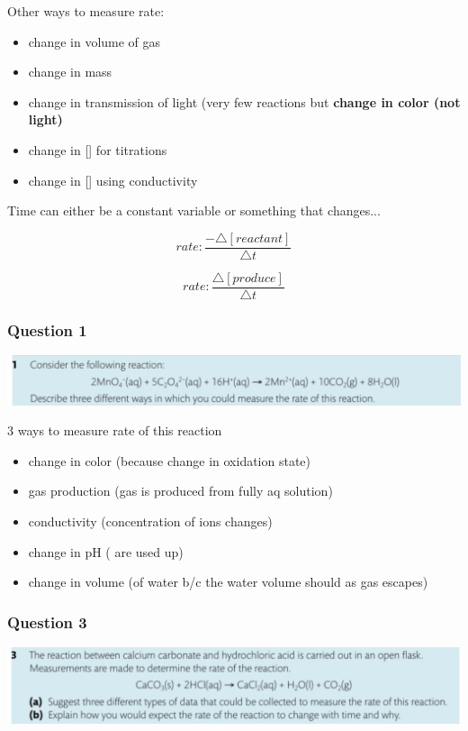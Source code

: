 \documentclass{article}
\begin{document}
Other ways to measure rate:
\begin{itemize}
\item change in volume of gas
\item change in mass
\item change in transmission of light (very few reactions but \textbf{change in color (not light)}
\item change in [] for titrations
\item change in [] using conductivity
\end{itemize}

Time can either be a constant variable or something that changes...


$$rate: \frac{-\triangle{[reactant]}}{\triangle{t}}$$

$$rate: \frac{\triangle{[produce]}}{\triangle{t}}$$


\subsubsection{Question 1}
\includegraphics[width=\textwidth]{2.1fig2.png}

3 ways to measure rate of this reaction
\begin{itemize}
\item change in color (because change in oxidation state)
\item gas production (gas is produced from fully aq solution)
\item conductivity (concentration of ions changes)
\item change in pH (\textbf{} are used up)
\item change in volume (of water b/c the water volume should  as gas escapes)
\end{itemize}


\subsubsection{Question 3}
\includegraphics[width=\textwidth]{2.1fig3.png}
\end{document}
